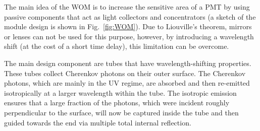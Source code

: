 % 
% 

The main idea of the WOM is to increase the sensitive area of a PMT by using 
passive components that act as light collectors and concentrators (a sketch of 
the module design is shown in Fig.~\ref{fig:WOM}). Due to Liouville's theorem, 
mirrors or lenses can not be used for this purpose, however, by introducing a 
wavelength shift (at the cost of a short time delay), this limitation can be 
overcome.

The main design component are tubes that have wavelength-shifting properties. 
These tubes collect Cherenkov photons on their outer surface. The Cherenkov 
photons, which are mainly in the UV regime, are absorbed and then re-emitted
isotropically at a larger wavelength within the tube. The isotropic emission 
ensures that a large fraction %
of the photons, which were incident roughly perpendicular to the surface, will 
now be captured inside the tube and then guided towards the end via multiple 
total internal reflection.

